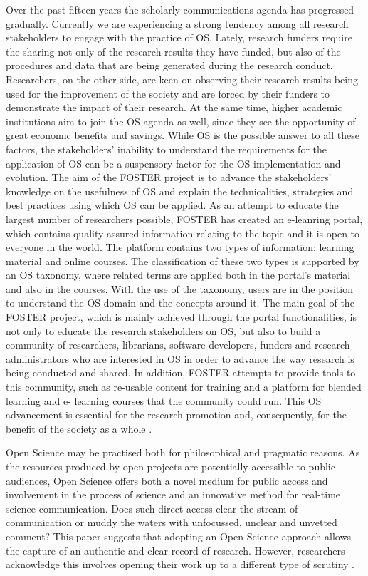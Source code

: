 Over the past fifteen years the scholarly communications agenda
has progressed gradually. Currently we are experiencing a strong
tendency among all research stakeholders to engage with the
practice of OS. Lately, research funders require the sharing not
only of the research results they have funded, but also of the
procedures and data that are being generated during the research
conduct. Researchers, on the other side, are keen on observing
their research results being used for the improvement of the
society and are forced by their funders to demonstrate the impact
of their research. At the same time, higher academic institutions
aim to join the OS agenda as well, since they see the opportunity
of great economic benefits and savings. While OS is the possible
answer to all these factors, the stakeholders’ inability to
understand the requirements for the application of OS can be a
suspensory factor for the OS implementation and evolution.
The aim of the FOSTER project is to advance the stakeholders'
knowledge on the usefulness of OS and explain the technicalities,
strategies and best practices using which OS can be applied. As an
attempt to educate the largest number of researchers possible,
FOSTER has created an e-leanring portal, which contains quality
assured information relating to the topic and it is open to everyone
in the world. The platform contains two types of information:
learning material and online courses. The classification of these
two types is supported by an OS taxonomy, where related terms
are applied both in the portal's material and also in the courses.
With the use of the taxonomy, users are in the position to
understand the OS domain and the concepts around it.
The main goal of the FOSTER project, which is mainly achieved
through the portal functionalities, is not only to educate the
research stakeholders on OS, but also to build a community of
researchers, librarians, software developers, funders and research
administrators who are interested in OS in order to advance the
way research is being conducted and shared. In addition, FOSTER
attempts to provide tools to this community, such as re-usable
content for training and a platform for blended learning and e-
learning courses that the community could run. This OS
advancement is essential for the research promotion and,
consequently, for the benefit of the society as a whole
\cite{Nancy2015}.

Open Science may be practised both
for philosophical and pragmatic reasons. As the
resources produced by open projects are
potentially accessible to public audiences, Open
Science offers both a novel medium for public
access and involvement in the process of science
and an innovative method for real-time science
communication. Does such direct access clear
the stream of communication or muddy the
waters with unfocussed, unclear and unvetted
comment? This paper suggests that adopting an
Open Science approach allows the capture of an
authentic and clear record of research.
However, researchers acknowledge this involves
opening their work up to a different type of
scrutiny \cite{Grand2010}.


